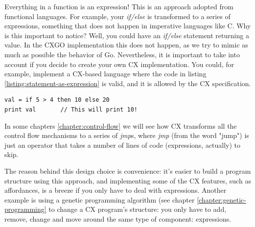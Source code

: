 \documentclass[11pt,fleqn,openany]{book} %
\begin{document}

Everything in a function is an expression! This is an approach adopted from functional languages. For example, your \textit{if/else} is transformed to a series of expressions, something that does not happen in imperative languages like C. Why is this important to notice? Well, you could have an \textit{if/else} statement returning a value. In the CXGO implementation this does not happen, as we try to mimic as much as possible the behavior of Go. Nevertheless, it is important to take into account if you decide to create your own CX implementation. You could, for example, implement a CX-based language where the code in listing \ref{listing:statement-as-expression} is valid, and it is allowed by the CX specification.

\begin{lstlisting}[caption={Example of if/else statement as an expression},captionpos=b,label={listing:statement-as-expression}]
val = if 5 > 4 then 10 else 20
print val       // This will print 10!
\end{lstlisting}

In some chapters \ref{chapter:control-flow} we will see how CX transforms all the control flow mechanisms to a series of \textit{jmp}s, where \textit{jmp} (from the word "jump") is just an operator that takes a number of lines of code (expressions, actually) to skip.

The reason behind this design choice is convenience: it's easier to build a program structure using this approach, and implementing some of the CX features, such as affordances, is a breeze if you only have to deal with expressions. Another example is using a genetic programming algorithm (see chapter \ref{chapter:genetic-programming} to change a CX program's structure: you only have to add, remove, change and move around the same type of component: expressions.
\end{document}

